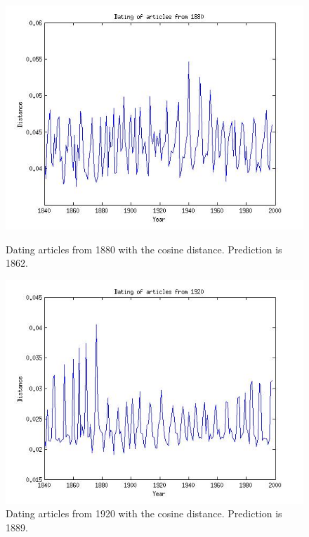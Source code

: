 
\begin{figure}[H]
    \begin{minipage}[b]{0.3\linewidth}
        \includegraphics[scale=0.25]{Pictures/date_articles/cos/dating1880.jpg}
        \caption{Dating articles from 1880 with the cosine distance. Prediction is 1862.}
    \end{minipage}\hfill
    \begin{minipage}[b]{0.3\linewidth}
        \includegraphics[scale=0.25]{Pictures/date_articles/cos/dating1920.jpg}
        \caption{Dating articles from 1920 with the cosine distance. Prediction is 1889.}
    \end{minipage}\hfill
    \begin{minipage}[b]{0.3\linewidth}

\end{minipage}
\end{figure}
